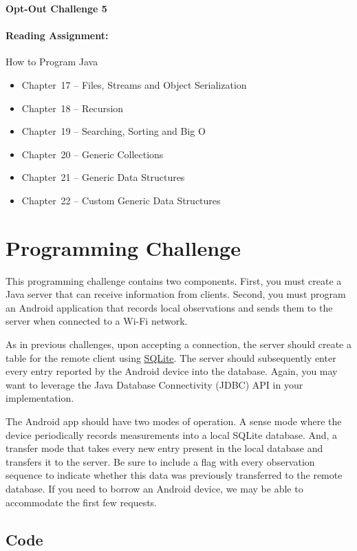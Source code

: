 \documentclass[11pt]{article}
\begin{document}
\begin{center}
{\bfseries \LARGE Opt-Out Challenge 5}
\end{center}

\paragraph{Reading Assignment:}
How to Program Java
\begin{itemize}
\item Chapter~17 -- Files, Streams and Object Serialization
\item Chapter~18 -- Recursion
\item Chapter~19 -- Searching, Sorting and Big O
\item Chapter~20 -- Generic Collections
\item Chapter~21 -- Generic Data Structures
\item Chapter~22 -- Custom Generic Data Structures
\end{itemize}


\section*{Programming Challenge}

This programming challenge contains two components.
First, you must create a Java server that can receive information from clients.
Second, you must program an Android application that records local observations and sends them to the server when connected to a Wi-Fi network.

As in previous challenges, upon accepting a connection, the server should create a table for the remote client using \href{http://www.sqlite.org/}{SQLite}.
The server should subsequently enter every entry reported by the Android device into the database.
Again, you may want to leverage the Java Database Connectivity (JDBC) API in your implementation.

The Android app should have two modes of operation.
A sense mode where the device periodically records measurements into a local SQLite database.
And, a transfer mode that takes every new entry present in the local database and transfers it to the server.
Be sure to include a flag with every observation sequence to indicate whether this data was previously transferred to the remote database. 
If you need to borrow an Android device, we may be able to accommodate the first few requests.

\subsection*{Code}
\end{document}
